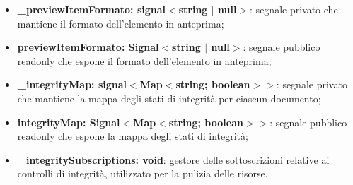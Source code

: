 \documentclass[a4paper,12pt]{article}
\begin{document}
{{{{\begin{itemize}
                    \item \textbf{\_previewItemFormato: signal$<$string $|$ null$>$}: segnale privato che mantiene il formato dell'elemento in anteprima;
                    \item \textbf{previewItemFormato: Signal$<$string $|$ null$>$}: segnale pubblico readonly che espone il formato dell'elemento in anteprima;
                    \item \textbf{\_integrityMap: signal$<$Map$<$string; boolean$>$$>$}: segnale privato che mantiene la mappa degli stati di integrità per ciascun documento;
                    \item \textbf{integrityMap: Signal$<$Map$<$string; boolean$>$$>$}: segnale pubblico readonly che espone la mappa degli stati di integrità;
                    \item \textbf{\_integritySubscriptions: void}: gestore delle sottoscrizioni relative ai controlli di integrità, utilizzato per la pulizia delle risorse.
                \end{itemize}
                
}}}}
\end{document}
